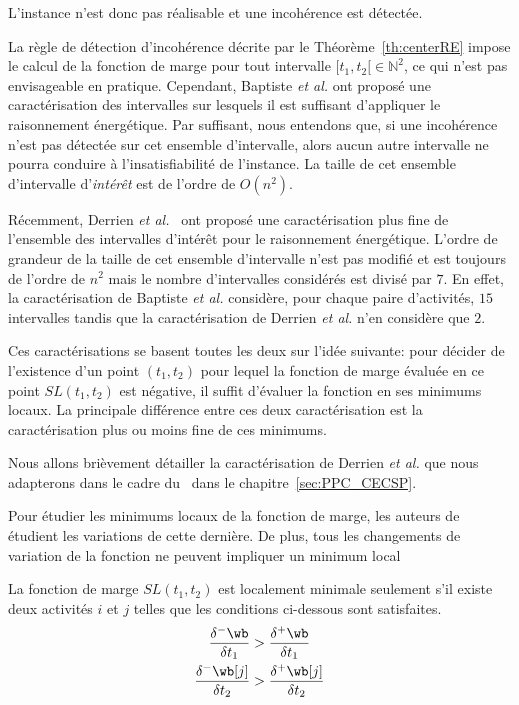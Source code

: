 \begin{ex}
L'instance n'est donc pas réalisable et une incohérence est détectée. 
\end{ex}

La règle de détection d'incohérence décrite par le
Théorème~\ref{th:centerRE} impose le calcul de la fonction de marge
pour tout intervalle $[t_1,t_2[ \in \mathbb{N}^2$, ce qui n'est pas
envisageable en pratique. Cependant, Baptiste {\it et al.} ont proposé
une caractérisation des intervalles sur lesquels il est suffisant
d'appliquer le raisonnement énergétique. Par suffisant, nous entendons
que, si une incohérence n'est pas détectée sur cet ensemble
d'intervalle, alors aucun autre intervalle ne pourra conduire à
l'insatisfiabilité de l'instance. La taille de cet ensemble
d'intervalle d'{\it intérêt} est de l'ordre de $O(n^2)$.

Récemment, Derrien {\it et al.}~\cite{DP} ont proposé une
caractérisation plus fine de l'ensemble des intervalles d'intérêt pour
le raisonnement énergétique. L'ordre de grandeur de la taille de cet
ensemble d'intervalle n'est pas modifié et est toujours de l'ordre de
$n^2$ mais le nombre d'intervalles considérés est divisé par $7$. En
effet, la caractérisation de Baptiste {\it et al.} considère, pour
chaque paire d'activités, $15$ intervalles tandis que la
caractérisation de Derrien {\it et al.} n'en considère que $2$.


Ces caractérisations se basent toutes les deux sur l'idée suivante:
pour décider de l'existence d'un point $(t_1,t_2)$ pour lequel la
fonction de marge évaluée en ce point $SL(t_1,t_2)$ est négative, il
suffit d'évaluer la fonction en ses minimums locaux. La principale
différence entre ces deux caractérisation est la caractérisation plus
ou moins fine de ces minimums.

Nous allons brièvement détailler la caractérisation de Derrien {\it et
al.} que nous adapterons dans le cadre du \CECSP~dans le
chapitre~\ref{sec:PPC_CECSP}.

Pour étudier les minimums locaux de la fonction de marge, les auteurs
de~\cite{DP} étudient les variations de cette dernière. De plus, tous
les changements de variation de la fonction ne peuvent impliquer un
minimum local 


\begin{lemma}
La fonction de marge $SL(t_1,t_2)$ est localement minimale seulement
s'il existe deux activités $i$ et $j$ telles que les conditions
ci-dessous sont satisfaites. 
\begin{align} \frac{\delta^{-}\wb}{\delta t_1} &>
\frac{\delta^{+}\wb}{\delta t_1} \label{eq:deriv1_CUSP}\\ 
\frac{\delta^{-}\wb[j]}{\delta t_2}
& > \frac{\delta^{+}\wb[j]}{\delta t_2} \label{eq:deriv2_CUSP}
\end{align}
\end{lemma}

